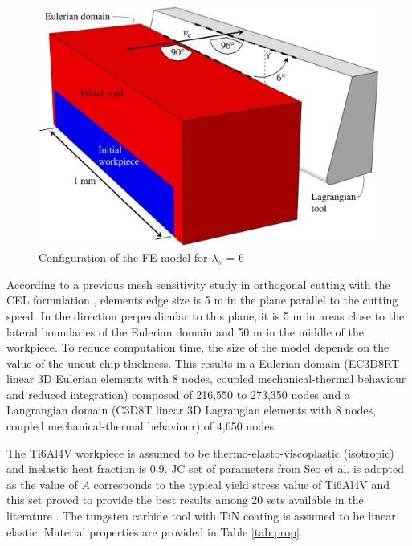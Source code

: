 \documentclass[preprint,12pt,times]{elsarticle}
\begin{document}
\begin{figure}[h]
\centering
\includegraphics[width = 140 mm]{Figures/FEConfig}
\caption{Configuration of the FE model for $\lambda_s$ = 6\textdegree{}}
\label{FEConfig}
\end{figure}

According to a previous mesh sensitivity study in orthogonal cutting with the CEL formulation \cite{ducobu_Finite_2017}, elements edge size is 5 \textmu{}m in the plane parallel to the cutting speed. In the direction perpendicular to this plane, it is 5 \textmu{}m in areas close to the lateral boundaries of the Eulerian domain and 50 \textmu{}m in the middle of the workpiece. To reduce computation time, the size of the model depends on the value of the uncut chip thickness. This results in a Eulerian domain (EC3D8RT linear 3D Eulerian elements with 8 nodes, coupled mechanical-thermal behaviour and reduced integration) composed of 216,550 to 273,350 nodes and a Langrangian domain (C3D8T linear 3D Lagrangian elements with 8 nodes, coupled mechanical-thermal behaviour) of 4,650 nodes.

The Ti6Al4V workpiece is assumed to be thermo-elasto-viscoplastic (isotropic) and inelastic heat fraction is 0.9. JC set of parameters from Seo et al. \cite{seo_Constitutive_2005} is adopted as the value of $A$ corresponds to the typical yield stress value of Ti6Al4V and this set proved to provide the best results among 20 sets available in the literature \cite{ducobu_Importance_2017}.  The tungsten carbide tool with TiN coating is assumed to be linear elastic. Material properties are provided in Table \ref{tab:prop}.
\end{document}
